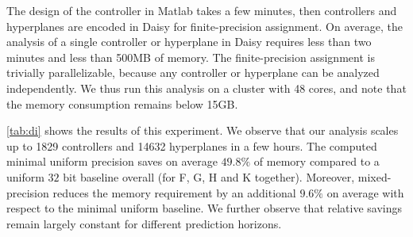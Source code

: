 The design of the controller in Matlab takes a few minutes, then controllers and
hyperplanes are encoded in Daisy for finite-precision assignment. On average, the
analysis of a single controller or hyperplane in Daisy requires less than two
minutes and less than 500MB of memory. The finite-precision assignment is trivially parallelizable, 
because any controller or hyperplane can be analyzed independently.
We thus run this analysis on a cluster with 48 cores, and note that the 
memory consumption remains below 15GB. 


\autoref{tab:di} shows the results of this experiment.
We observe that our analysis scales up to 1829 controllers and 14632 hyperplanes in a few hours.  The computed minimal uniform precision saves on average $49.8\%$ of memory
compared to a uniform $32$ bit baseline overall (for F, G, H and K together). 
Moreover, mixed-precision reduces the memory requirement by an additional
$9.6\%$ on average with respect to the minimal uniform baseline.
We further observe that relative savings remain largely constant for different 
prediction horizons.
